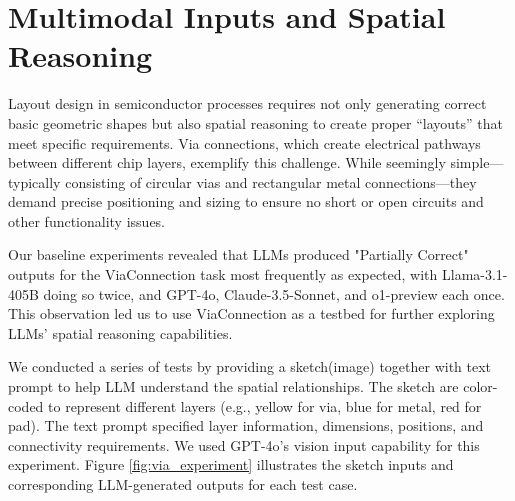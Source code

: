 \documentclass{article}
\begin{document}
\section{Multimodal Inputs and Spatial Reasoning}
Layout design in semiconductor processes requires not only generating correct basic geometric shapes but also spatial reasoning to create proper ``layouts'' that meet specific requirements. Via connections, which create electrical pathways between different chip layers, exemplify this challenge. While seemingly simple—typically consisting of circular vias and rectangular metal connections—they demand precise positioning and sizing to ensure no short or open circuits and other functionality issues.

Our baseline experiments revealed that LLMs produced "Partially Correct" outputs for the ViaConnection task most frequently as expected, with Llama-3.1-405B doing so twice, and GPT-4o, Claude-3.5-Sonnet, and o1-preview each once. This observation led us to use ViaConnection as a testbed for further exploring LLMs' spatial reasoning capabilities.

We conducted a series of tests by providing a sketch(image) together with text prompt to help LLM understand the spatial relationships. The sketch are color-coded to represent different layers (e.g., yellow for via, blue for metal, red for pad). The text prompt specified layer information, dimensions, positions, and connectivity requirements. We used GPT-4o's vision input capability for this experiment. Figure \ref{fig:via_experiment} illustrates the sketch inputs and corresponding LLM-generated outputs for each test case.
\end{document}
